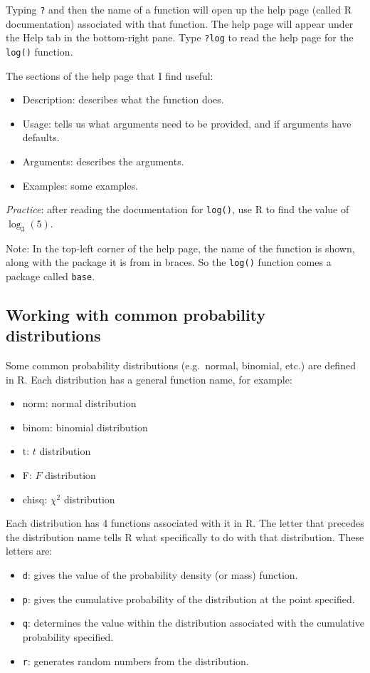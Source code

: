 \documentclass[
]{book}
\providecommand{\tightlist}{%
  \setlength{\itemsep}{0pt}\setlength{\parskip}{0pt}}
\theoremstyle{definition}
\theoremstyle{definition}
\theoremstyle{definition}
\theoremstyle{definition}
\theoremstyle{remark}
\begin{document}
Typing \texttt{?} and then the name of a function will open up the help page (called R documentation) associated with that function. The help page will appear under the Help tab in the bottom-right pane. Type \texttt{?log} to read the help page for the \texttt{log()} function.

The sections of the help page that I find useful:

\begin{itemize}
\tightlist
\item
  Description: describes what the function does.
\item
  Usage: tells us what arguments need to be provided, and if arguments have defaults.
\item
  Arguments: describes the arguments.
\item
  Examples: some examples.
\end{itemize}

\emph{Practice}: after reading the documentation for \texttt{log()}, use R to find the value of \(\log_3(5)\).

Note: In the top-left corner of the help page, the name of the function is shown, along with the package it is from in braces. So the \texttt{log()} function comes a package called \texttt{base}.

\hypertarget{distributions}{%
\subsection{Working with common probability distributions}\label{distributions}}

Some common probability distributions (e.g.~normal, binomial, etc.) are defined in R. Each distribution has a general function name, for example:

\begin{itemize}
\tightlist
\item
  norm: normal distribution
\item
  binom: binomial distribution
\item
  t: \(t\) distribution
\item
  F: \(F\) distribution
\item
  chisq: \(\chi^2\) distribution
\end{itemize}

Each distribution has 4 functions associated with it in R. The letter that precedes the distribution name tells R what specifically to do with that distribution. These letters are:

\begin{itemize}
\tightlist
\item
  \texttt{d}: gives the value of the probability density (or mass) function.
\item
  \texttt{p}: gives the cumulative probability of the distribution at the point specified.
\item
  \texttt{q}: determines the value within the distribution associated with the cumulative probability specified.
\item
  \texttt{r}: generates random numbers from the distribution.
\end{itemize}
\end{document}
